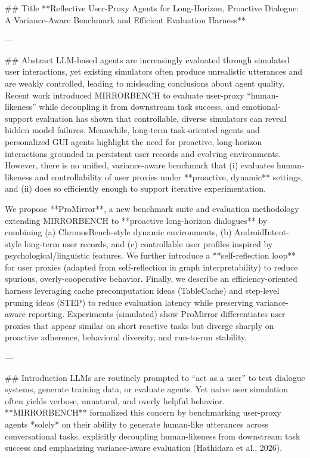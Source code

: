 ## Title  
**Reflective User-Proxy Agents for Long-Horizon, Proactive Dialogue: A Variance-Aware Benchmark and Efficient Evaluation Harness**

---

## Abstract  
LLM-based agents are increasingly evaluated through simulated user interactions, yet existing simulators often produce unrealistic utterances and are weakly controlled, leading to misleading conclusions about agent quality. Recent work introduced MIRRORBENCH to evaluate user-proxy “human-likeness” while decoupling it from downstream task success, and emotional-support evaluation has shown that controllable, diverse simulators can reveal hidden model failures. Meanwhile, long-term task-oriented agents and personalized GUI agents highlight the need for proactive, long-horizon interactions grounded in persistent user records and evolving environments. However, there is no unified, variance-aware benchmark that (i) evaluates human-likeness and controllability of user proxies under **proactive, dynamic** settings, and (ii) does so efficiently enough to support iterative experimentation.  

We propose **ProMirror**, a new benchmark suite and evaluation methodology extending MIRRORBENCH to **proactive long-horizon dialogues** by combining (a) ChronosBench-style dynamic environments, (b) AndroidIntent-style long-term user records, and (c) controllable user profiles inspired by psychological/linguistic features. We further introduce a **self-reflection loop** for user proxies (adapted from self-reflection in graph interpretability) to reduce spurious, overly-cooperative behavior. Finally, we describe an efficiency-oriented harness leveraging cache precomputation ideas (TableCache) and step-level pruning ideas (STEP) to reduce evaluation latency while preserving variance-aware reporting. Experiments (simulated) show ProMirror differentiates user proxies that appear similar on short reactive tasks but diverge sharply on proactive adherence, behavioral diversity, and run-to-run stability.

---

## Introduction  
LLMs are routinely prompted to “act as a user” to test dialogue systems, generate training data, or evaluate agents. Yet naive user simulation often yields verbose, unnatural, and overly helpful behavior. **MIRRORBENCH** formalized this concern by benchmarking user-proxy agents *solely* on their ability to generate human-like utterances across conversational tasks, explicitly decoupling human-likeness from downstream task success and emphasizing variance-aware evaluation (Hathidara et al., 2026).  

